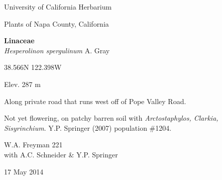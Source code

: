 \documentclass[letterpaper,10pt]{article}
\begin{document}
\begin{minipage}[t]{0.40\textwidth}

\begin{center}
University of California Herbarium \\
\begin{large}
Plants of Napa County, California \\
\end{large}
\vspace{\baselineskip}
\textbf{Linaceae} \\
\textit{Hesperolinon spergulinum} A. Gray\\
\end{center}

\begin{footnotesize}

\begin{multicols}{2}
38.566\textdegree N 122.398\textdegree W
\columnbreak
\begin{flushright}
Elev. 287 m
\end{flushright}
\end{multicols}

Along private road that runs west off of Pope Valley Road.
\vspace{\baselineskip}

Not yet flowering, on patchy barren soil with \textit{Arctostaphylos, Clarkia, Sisyrinchium}. Y.P. Springer (2007) population \#1204.

\begin{multicols}{2}
W.A. Freyman 221 \\
with A.C. Schneider \& Y.P. Springer
\columnbreak
\begin{flushright}
17 May 2014
\end{flushright}
\end{multicols}

\end{footnotesize}

\end{minipage}
%
\hspace{2cm}
%
\end{document}
